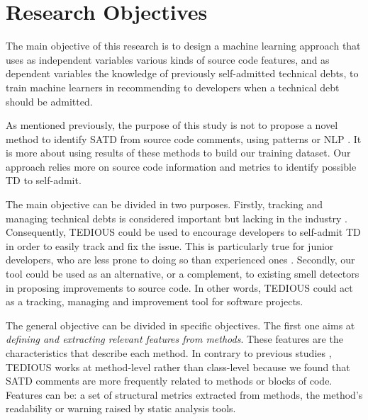 \section{Research Objectives}  


\begin{framed}
	The main objective of this research is to design a machine learning approach that uses as independent variables various kinds of source code features, and as dependent variables the knowledge of previously self-admitted technical debts, to train machine learners in recommending to developers when a technical debt should be admitted.
\end{framed}

As mentioned previously, the purpose of this study is not to propose a novel method to identify SATD from source code comments, using patterns or \ac{NLP} \citep{MaldonadoNLP,PotdarS14}. It is more about using results of these methods to build our training dataset. Our approach relies more on source code information and metrics to identify possible \ac{TD} to self-admit. \par
 
The main objective can be divided in two purposes. Firstly, tracking and managing technical debts is considered important but lacking in the industry \citep{Ernst:2015:MMI:2786805.2786848}. Consequently, \ac{TEDIOUS} could be used to encourage developers to self-admit \ac{TD} in order to easily track and fix the issue. This is particularly true for junior developers, who are less prone to doing so than experienced ones \citep{PotdarS14}. Secondly, our tool could be used as an alternative, or a complement, to existing smell detectors in proposing improvements to source code. In other words, \ac{TEDIOUS} could act as a tracking, managing and improvement tool for software projects. \par

The general objective can be divided in specific objectives. The first one aims at \emph{defining and extracting relevant features from methods}. These features are the characteristics that describe each method. In contrary to previous studies \citep{BavotaR16}, \ac{TEDIOUS} works at method-level rather than class-level because we found that \ac{SATD} comments are more frequently related to methods or blocks of code. Features can be: a set of structural metrics extracted from methods, the method's readability or warning raised by static analysis tools. \par

